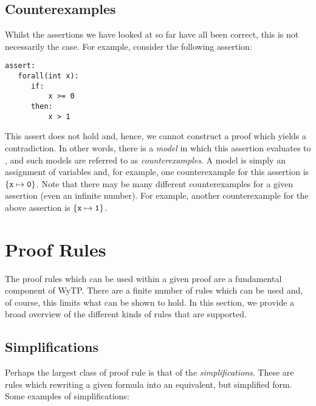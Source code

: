 \subsection{Counterexamples}

Whilst the assertions we have looked at so far have all been correct,
this is not necessarily the case.  For example, consider the following
assertion:

\begin{tcolorbox}\begin{lstlisting}[language=WyAL]
assert:
   forall(int x):
      if:
          x >= 0
      then:
          x > 1
\end{lstlisting}\end{tcolorbox}

This assert does not hold and, hence, we cannot construct a proof
which yields a contradiction.  In other words, there is a {\em model}
in which this assertion evaluates to , and such
models are referred to as {\em counterexamples}.  A model is simply an
assignment of variables and, for example, one counterexample for this
assertion is ${\tt\{x\mapsto 0\}}$.  Note that there may be many
different counterexamples for a given assertion (even an infinite
number).  For example, another counterexample for the above assertion
is ${\tt\{x\mapsto 1\}}$.

\section{Proof Rules}

The proof rules which can be used within a given proof are a
fundamental component of WyTP.  There are a finite number of rules
which can be used and, of course, this limits what can be shown to
hold.  In this section, we provide a broad overview of the different
kinds of rules that are supported.

\subsection{Simplifications}

Perhaps the largest class of proof rule is that of the {\em
  simplifications}.  These are rules which rewriting a given formula
into an equivalent, but simplified form.  Some examples of
simplifications:

